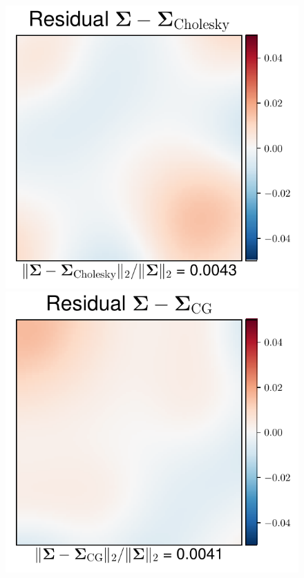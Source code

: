 \documentclass[nohypdvips,onefignum,onetabnum]{siamart171218}
\begin{document}
\begin{figure}
  \mbox{{\includegraphics[scale=0.4]{images/simu1_ex1_A_Chol.pdf}}}
  \mbox{{\includegraphics[scale=0.4]{images/simu1_ex1_A_CG.pdf}}}

\end{figure}
\end{document}

